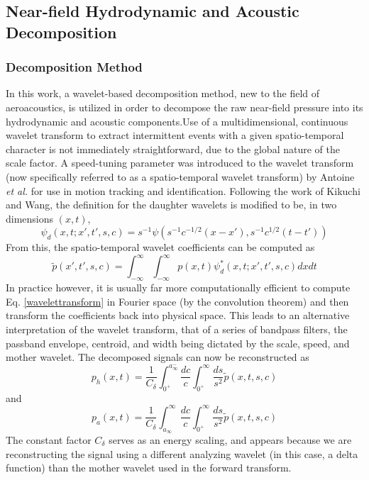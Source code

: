 \documentclass[english]{aiaa-tc}
\begin{document}
\subsection{Near-field Hydrodynamic and Acoustic Decomposition}
\subsubsection{Decomposition Method}
In this work, a wavelet-based decomposition method, new to the field of aeroacoustics, is utilized in order to decompose the raw near-field pressure into its hydrodynamic and acoustic components.Use of a multidimensional, continuous wavelet transform to extract intermittent events with a given spatio-temporal character is not immediately straightforward, due to the global nature of the scale factor. A speed-tuning parameter was introduced to the wavelet transform (now specifically referred to as a spatio-temporal wavelet transform) by Antoine {\em et al.}\cite{Antoine2004} for use in motion tracking and identification. Following the work of Kikuchi and Wang\cite{Kikuchi2010}, the definition for the daughter wavelets is modified to be, in two dimensions $(x,t)$, 
\begin{equation}
\psi_{d}(x,t;x',t',s,c)=s^{-1}\psi \left( s^{-1}c^{-1/2}(x-x'),s^{-1}c^{1/2}(t-t') \right)
\end{equation}
From this, the spatio-temporal wavelet coefficients can be computed as
\begin{equation}\label{wavelettransform}
\tilde{p}(x',t',s,c)=\int_{-\infty}^{\infty}\int_{-\infty}^{\infty}p(x,t)\psi^{*}_{d}(x,t;x',t',s,c)dxdt 
\end{equation}
In practice however, it is usually far more computationally efficient to compute Eq. \ref{wavelettransform} in Fourier space (by the convolution theorem) and then transform the coefficients back into physical space. This leads to an alternative interpretation of the wavelet transform, that of a series of bandpass filters, the passband envelope, centroid, and width being dictated by the scale, speed, and mother wavelet\cite{Torrence1998,Farge1992,Antoine2004}. The decomposed signals can now be reconstructed as
\begin{equation}
p_{h}(x,t) = \frac{1}{C_{\delta}}\int_{0^{+}}^{a_{\infty}^{-}}\frac{dc}{c}\int_{0^{+}}^{\infty}\frac{ds}{s^{2}}\tilde{p}(x,t,s,c)
\end{equation}
and
\begin{equation}
p_{a}(x,t) = \frac{1}{C_{\delta}}\int_{a_{\infty}}^{\infty}\frac{dc}{c}\int_{0^{+}}^{\infty}\frac{ds}{s^{2}}\tilde{p}(x,t,s,c)
\end{equation}
The constant factor $C_{\delta}$ serves as an energy scaling, and appears because we are reconstructing the signal using a different analyzing wavelet (in this case, a delta function) than the mother wavelet used in the forward transform\cite{Torrence1998,Farge1992}.
\end{document}
